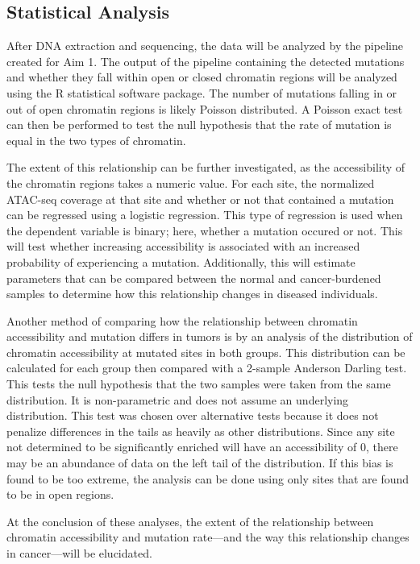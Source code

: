 \subsection{Statistical Analysis}
After DNA extraction and sequencing, the data will be analyzed by the pipeline created for Aim 1. The output of the pipeline containing the detected mutations and whether they fall within open or closed chromatin regions will be analyzed using the R statistical software package.
The number of mutations falling in or out of open chromatin regions is likely Poisson distributed. A Poisson exact test can then be performed to test the null hypothesis that the rate of mutation is equal in the two types of chromatin.

The extent of this relationship can be further investigated, as the accessibility of the chromatin regions takes a numeric value. For each site, the normalized ATAC-seq coverage at that site and whether or not that contained a mutation can be regressed using a logistic regression. This type of regression is used when the dependent variable is binary; here, whether a mutation occured or not. This will test whether increasing accessibility is associated with an increased probability of experiencing a mutation. Additionally, this will estimate parameters that can be compared between the normal and cancer-burdened samples to determine how this relationship changes in diseased individuals.

Another method of comparing how the relationship between chromatin accessibility and mutation differs in tumors is by an analysis of the distribution of chromatin accessibility at mutated sites in both groups. This distribution can be calculated for each group then compared with a 2-sample Anderson Darling test. This tests the null hypothesis that the two samples were taken from the same distribution. It is non-parametric and does not assume an underlying distribution. This test was chosen over alternative tests because it does not penalize differences in the tails as heavily as other distributions. Since any site not determined to be significantly enriched will have an accessibility of 0, there may be an abundance of data on the left tail of the distribution. If this bias is found to be too extreme, the analysis can be done using only sites that are found to be in open regions.

At the conclusion of these analyses, the extent of the relationship between chromatin accessibility and mutation rate---and the way this relationship changes in cancer---will be elucidated.

\clearpage

\printbibliography

